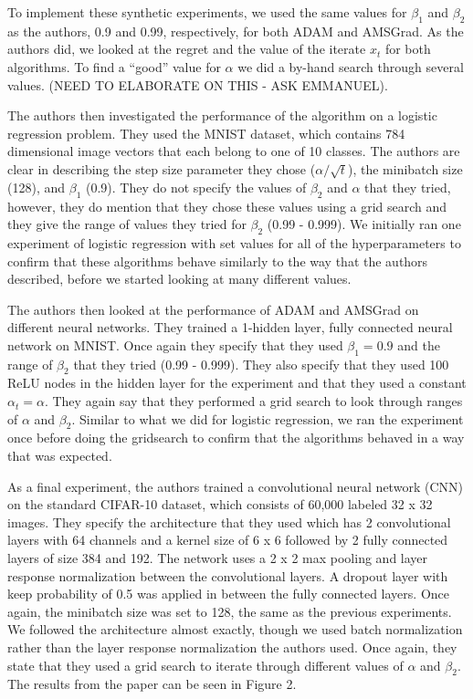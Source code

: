 \documentclass[letterpaper, 10 pt, conference]{ieeeconf}  %
\begin{document}
To implement these synthetic experiments, we used the same values for $\beta_{1}$ and $\beta_{2}$ as the authors, 0.9 and 0.99, respectively, for both ADAM and AMSGrad. As the authors did, we looked at the regret and the value of the iterate $x_{t}$ for both algorithms. To find a ``good'' value for $\alpha$ we did a by-hand search through several values. (NEED TO ELABORATE ON THIS - ASK EMMANUEL). \par
The authors then investigated the performance of the algorithm on a logistic regression problem. They used the MNIST dataset, which contains 784 dimensional image vectors that each belong to one of 10 classes. The authors are clear in describing the step size parameter they chose ($\alpha / \sqrt{t}$), the minibatch size (128), and $\beta_{1}$ (0.9). They do not specify the values of $\beta_{2}$ and $\alpha$ that they tried, however, they do mention that they chose these values using a grid search and they give the range of values they tried for $\beta_{2}$ (0.99 - 0.999). We initially ran one experiment of logistic regression with set values for all of the hyperparameters to confirm that these algorithms behave similarly to the way that the authors described, before we started looking at many different values. \par
The authors then looked at the performance of ADAM and AMSGrad on different neural networks. They trained a 1-hidden layer, fully connected neural network on MNIST. Once again they specify that they used $\beta_{1} = 0.9$ and the range of $\beta_{2}$ that they tried (0.99 - 0.999). They also specify that they used 100 ReLU nodes in the hidden layer for the experiment and that they used a constant $\alpha_{t} = \alpha$. They again say that they performed a grid search to look through ranges of $\alpha$ and $\beta_{2}$. Similar to what we did for logistic regression, we ran the experiment once before doing the gridsearch to confirm that the algorithms behaved in a way that was expected. \par
As a final experiment, the authors trained a convolutional neural network (CNN) on the standard CIFAR-10 dataset, which consists of 60,000 labeled 32 x 32 images. They specify the architecture that they used which has 2 convolutional layers with 64 channels and a kernel size of 6 x 6 followed by 2 fully connected layers of size 384 and 192. The network uses a 2 x 2 max pooling and layer response normalization between the convolutional layers. A dropout layer with keep probability of 0.5 was applied in between the fully connected layers. Once again, the minibatch size was set to 128, the same as the previous experiments. We followed the architecture almost exactly, though we used batch normalization rather than the layer response normalization the authors used. Once again, they state that they used a grid search to iterate through different values of $\alpha$ and $\beta_{2}$. The results from the paper can be seen in Figure 2. \par
\end{document}
